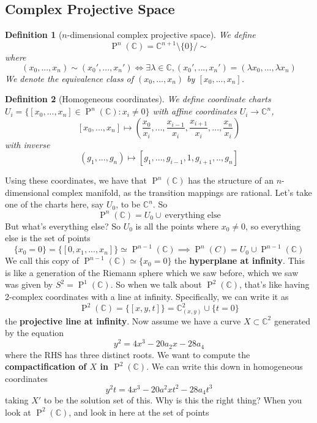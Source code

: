 \documentclass{article}
\newcommand{\mbb}[1]{\mathbb{#1}}
\newtheorem{definition}{Definition}
\DeclareMathOperator{\BigP}{P}
\newcommand{\Prj}[2]{\BigP^{#1}({#2})}
\begin{document}
\subsection{Complex Projective Space}

\begin{definition}[\(n\)-dimensional complex projective space]
We define
\[\Prj{n}{\mbb{C}} = \mbb{C}^{n + 1} \setminus \{0\} / \sim\]
where
\[(x_0,...,x_n) \sim (x_0',...,x_n') \iff \exists \lambda \in \mbb{C}, (x_0',...,x_n') = (\lambda x_0,..., \lambda x_n)\]
We denote the equivalence class of \((x_0,...,x_n)\) by \([x_0,...,x_n]\).
\end{definition}
\begin{definition}[Homogeneous coordinates]
We define coordinate charts \(U_i = \{[x_0, ..., x_n] \in \Prj{n}{\mbb{C}} : x_i \neq 0\}\) with affine coordinates \(U_i \to \mbb{C}^n\),
\[[x_0,...,x_n] \mapsto \left(\frac{x_0}{x_i},...,\frac{x_{i - 1}}{x_i}, \frac{x_{i + 1}}{x_i},...,\frac{x_n}{x_i}\right)\]
with inverse
\[(g_1,...,g_n) \mapsto [g_1,...,g_{i - 1}, 1, g_{i + 1},..,g_n]\]
\end{definition}
Using these coordinates, we have that \(\Prj{n}{\mbb{C}}\) has the structure of an \(n\)-dimensional complex manifold, as the transition mappings are rational. Let's take one of the charts here, say \(U_0\), to be \(\mbb{C}^n\). So
\[\Prj{n}{\mbb{C}} = U_0 \cup \ \text{everything else}\]
But what's everything else? So \(U_0\) is all the points where \(x_0 \neq 0\), so everything else is the set of points
\[\{x_0 = 0\} = \{[0, x_1,...,x_n]\} \simeq \Prj{n - 1}{\mbb{C}} \implies \Prj{n}{C} = U_0 \cup \Prj{n - 1}{\mbb{C}}\]
We call this copy of \(\Prj{n - 1}{\mbb{C}} \simeq \{x_0 = 0\}\) the \textbf{hyperplane at infinity}. This is like a generation of the Riemann sphere which we saw before, which we saw was given by \(S^2 = \Prj{1}{\mbb{C}}\). So when we talk about \(\Prj{2}{\mbb{C}}\), that's like having 2-complex coordinates with a line at infinity. Specifically, we can write it as
\[\Prj{2}{\mbb{C}} = \{[x, y, t]\} = \mbb{C}^2_{(x, y)} \cup \{t = 0\}\]
the \textbf{projective line at infinity}.
Now assume we have a curve \(X \subset \mbb{C}^2\) generated by the equation
\[y^2 = 4x^3 - 20a_2x - 28a_4\]
where the RHS has three distinct roots. We want to compute the \textbf{compactification of \(X\) in \(\Prj{2}{\mbb{C}}\)}. We can write this down in homogeneous coordinates
\[y^2t = 4x^3 - 20a^2xt^2 - 28a_4t^3\]
taking \(X'\) to be the solution set of this.
Why is this the right thing? When you look at \(\Prj{2}{\mbb{C}}\), and look in here at the set of points
\end{document}
